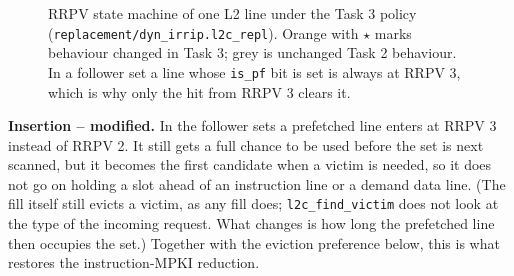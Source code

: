 \documentclass[10pt]{article}
\begin{document}
\begin{figure}[H]

\vspace{0.8em}
\caption{RRPV state machine of one L2 line under the Task 3 policy (\texttt{replacement/dyn\_irrip.l2c\_repl}). Orange with $\star$ marks behaviour changed in Task 3; grey is unchanged Task 2 behaviour. In a follower set a line whose \texttt{is\_pf} bit is set is always at RRPV 3, which is why only the hit from RRPV 3 clears it.}
\label{fig:rrpv}
\end{figure}

\textbf{Insertion -- modified.} In the follower sets a prefetched line enters at RRPV 3 instead of RRPV 2. It still gets a full chance to be used before the set is next scanned, but it becomes the first candidate when a victim is needed, so it does not go on holding a slot ahead of an instruction line or a demand data line. (The fill itself still evicts a victim, as any fill does; \texttt{l2c\_find\_victim} does not look at the type of the incoming request. What changes is how long the prefetched line then occupies the set.) Together with the eviction preference below, this is what restores the instruction-MPKI reduction.
\end{document}
